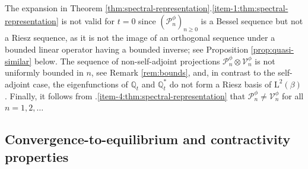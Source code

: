 \documentclass[10pt]{amsart}
\theoremstyle{plain}
\theoremstyle{definition}
\renewcommand{\P}{\mathcal{P}}
\newcommand{\V}{\mathcal{V}}
\newcommand{\J}{\mathds{Q}}
\newcommand{\Leb}{\mathrm{L}}
\let\bpsi\beta
\begin{document}
The expansion in Theorem \ref{thm:spectral-representation}.\eqref{item-1:thm:spectral-representation} is not valid for $t =0$ since $(\P_n^\phi)_{n \geq 0}$ is a Bessel sequence but not a Riesz sequence, as it is not the image of an orthogonal sequence under a bounded linear operator having a bounded inverse; see Proposition \ref{prop:quasi-similar} below. The sequence of non-self-adjoint projections $\P_n^\phi \otimes \V_n^\phi$ is not uniformly bounded in $n$, see Remark \ref{rem:bounds}, and, in contrast to the self-adjoint case, the eigenfunctions of $\J_t$ and $\J_t^*$ do not form a Riesz basis of $\Leb^2(\bpsi)$. Finally, it follows from .\eqref{item-4:thm:spectral-representation} that $\P_n^\phi \neq \V_n^\phi$ for all $n = 1,2,\ldots$

\subsection{Convergence-to-equilibrium and contractivity properties}
\end{document}
